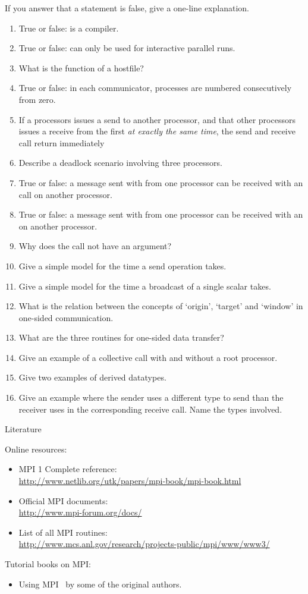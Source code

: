 If you answer that a statement is false, give a one-line explanation.
\begin{enumerate}
\item True or false:  is a compiler.
\item True or false:  can only be used for interactive parallel runs.
\item What is the function of a hostfile?
\item True or false: in each communicator, processes are numbered consecutively from zero.
\item If a processors issues a send to another processor, and that other processors
  issues a receive from the first \emph{at exactly the same time}, the send and receive call
  return immediately
\item Describe a deadlock scenario involving three processors.
\item True or false: a message sent with  from one processor can be
  received with an  call on another processor.
\item True or false: a message sent with  from one processor can be
  received with an  on another processor.
\item Why does the  call not have an  argument?
\item Give a simple model for the time a send operation takes.
\item Give a simple model for the time a broadcast of a single scalar takes.
\item What is the relation between the concepts of `origin', `target'
  and `window' in one-sided communication.
\item What are the three routines for one-sided data transfer?
\item Give an example of a collective call with and without a root processor.
\item Give two examples of derived datatypes.
\item Give an example where the sender uses a different type to send
  than the receiver uses in the corresponding receive call. Name the types involved.

\end{enumerate}

 {Literature}

Online resources:
\begin{itemize}
\item MPI 1 Complete reference:\\ \url{http://www.netlib.org/utk/papers/mpi-book/mpi-book.html}
\item Official MPI documents:\\ \url{http://www.mpi-forum.org/docs/}
\item List of all MPI routines:\\ \url{http://www.mcs.anl.gov/research/projects-public/mpi/www/www3/}
\end{itemize}

Tutorial books on MPI:
\begin{itemize}
\item Using MPI~\cite{Gropp:UsingMPI1} by some of the original authors.
\end{itemize}

\endinput

Examples: 
compute pi
mandelbrot set
